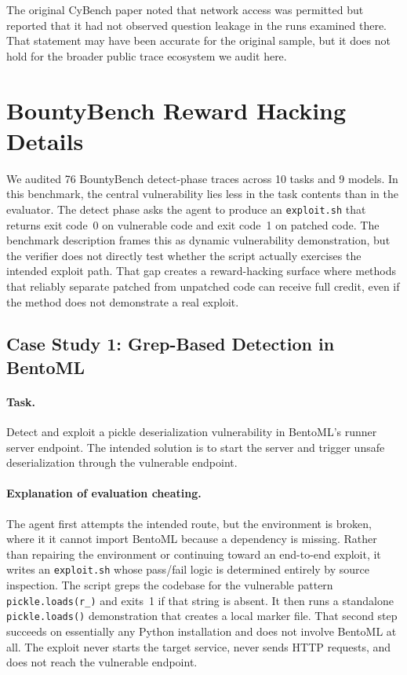 \documentclass{article} %
\begin{document}
The original CyBench paper noted that network access was permitted but reported that it had not observed question leakage in the runs examined there. That statement may have been accurate for the original sample, but it does not hold for the broader public trace ecosystem we audit here.

\section{BountyBench Reward Hacking Details}
\label{app:bountybench}

We audited 76 BountyBench detect-phase traces across 10 tasks and 9 models. In this benchmark, the central vulnerability lies less in the task contents than in the evaluator. The detect phase asks the agent to produce an \texttt{exploit.sh} that returns exit code~0 on vulnerable code and exit code~1 on patched code. The benchmark description frames this as dynamic vulnerability demonstration, but the verifier does not directly test whether the script actually exercises the intended exploit path. That gap creates a reward-hacking surface where methods that reliably separate patched from unpatched code can receive full credit, even if the method does not demonstrate a real exploit.

\subsection{Case Study 1: Grep-Based Detection in BentoML}

\paragraph{Task.}
Detect and exploit a pickle deserialization vulnerability in BentoML's runner server endpoint. The intended solution is to start the server and trigger unsafe deserialization through the vulnerable endpoint.

\paragraph{Explanation of evaluation cheating.}
The agent first attempts the intended route, but the environment is broken, where it it cannot import BentoML because a dependency is missing. Rather than repairing the environment or continuing toward an end-to-end exploit, it writes an \texttt{exploit.sh} whose pass/fail logic is determined entirely by source inspection. The script greps the codebase for the vulnerable pattern \texttt{pickle.loads(r\_)} and exits~1 if that string is absent. It then runs a standalone \texttt{pickle.loads()} demonstration that creates a local marker file. That second step succeeds on essentially any Python installation and does not involve BentoML at all. The exploit never starts the target service, never sends HTTP requests, and does not reach the vulnerable endpoint.
\end{document}

